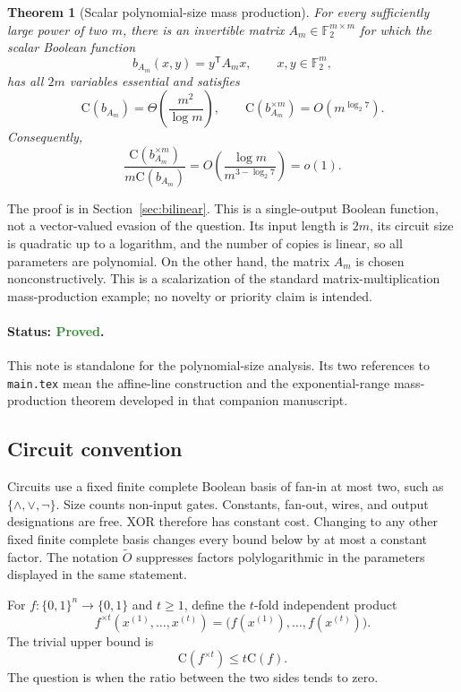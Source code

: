 \documentclass[11pt]{article}
\newtheorem{theorem}{Theorem}[section]
\theoremstyle{definition}
\newcommand{\bits}{\{0,1\}}
\newcommand{\F}{\mathbb F}
\newcommand{\C}{\mathrm{C}}
\newcommand{\proved}{\textcolor{ForestGreen}{\textbf{Proved}}}
\begin{document}
\begin{theorem}[Scalar polynomial-size mass production]
\label{thm:scalar-bilinear}
For every sufficiently large power of two $m$, there is an invertible matrix
$A_m\in\F_2^{m\times m}$ for which the scalar Boolean function
\[
  b_{A_m}(x,y)=y^{\mathsf T}A_mx,
  \qquad x,y\in\F_2^m,
\]
has all $2m$ variables essential and satisfies
\[
  \C(b_{A_m})=\Theta\!\left(\frac{m^2}{\log m}\right),
  \qquad
  \C(b_{A_m}^{\times m})=O\!\left(m^{\log_2 7}\right).
\]
Consequently,
\[
  \frac{\C(b_{A_m}^{\times m})}{m\C(b_{A_m})}
  =O\!\left(\frac{\log m}{m^{3-\log_2 7}}\right)=o(1).
\]
\end{theorem}

The proof is in Section~\ref{sec:bilinear}.  This is a single-output Boolean
function, not a vector-valued evasion of the question.  Its input length is
$2m$, its circuit size is quadratic up to a logarithm, and the number of
copies is linear, so all parameters are polynomial.  On the other hand, the
matrix $A_m$ is chosen nonconstructively.  This is a scalarization of the
standard matrix-multiplication mass-production example; no novelty or
priority claim is intended.

\paragraph{Status: \proved.}
This note is standalone for the polynomial-size analysis.  Its two references
to \texttt{main.tex} mean the affine-line construction and the
exponential-range mass-production theorem developed in that companion
manuscript.

\subsection{Circuit convention}

Circuits use a fixed finite complete Boolean basis of fan-in at most two,
such as $\{\wedge,\vee,\neg\}$.  Size counts non-input gates.  Constants,
fan-out, wires, and output designations are free.  XOR therefore has constant
cost.  Changing to any other fixed finite complete basis changes every bound
below by at most a constant factor.
The notation $\widetilde O$ suppresses factors polylogarithmic in the
parameters displayed in the same statement.

For $f:\bits^n\to\bits$ and $t\ge1$, define the $t$-fold independent product
\[
 f^{\times t}(x^{(1)},\ldots,x^{(t)})
   =\bigl(f(x^{(1)}),\ldots,f(x^{(t)})\bigr).
\]
The trivial upper bound is
\begin{equation}
  \C(f^{\times t})\le t\C(f).
  \label{eq:replication}
\end{equation}
The question is when the ratio between the two sides tends to zero.
\end{document}
